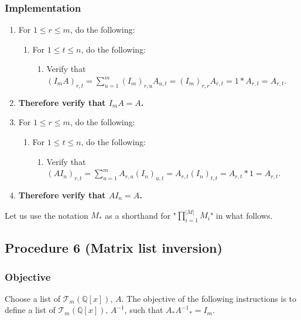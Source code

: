 \documentclass[twocolumn]{article}
\begin{document}
			\subsubsection{Implementation}
				\begin{enumerate}
					\item For $1\le r\le m$, do the following:
					\begin{enumerate}
						\item For $1\le t\le n$, do the following:
						\begin{enumerate}
							\item Verify that $(I_mA)_{r,t}=\sum_{u=1}^m (I_m)_{r,u}A_{u,t}=(I_m)_{r,r}A_{r,t}=1*A_{r,t}=A_{r,t}$.
						\end{enumerate}
					\end{enumerate}
					\item \textbf{Therefore verify that $I_mA=A$.}
					\item For $1\le r\le m$, do the following:
					\begin{enumerate}
						\item For $1\le t\le n$, do the following:
						\begin{enumerate}
							\item Verify that $(AI_n)_{r,t}=\sum_{u=1}^m A_{r,u}(I_n)_{u,t}=A_{r,t}(I_n)_{t,t}=A_{r,t}*1=A_{r,t}$.
						\end{enumerate}
					\end{enumerate}
					\item \textbf{Therefore verify that $AI_n=A$.}
				\end{enumerate}
		Let us use the notation $M_*$ as a shorthand for "$\prod_{i=1}^{\lvert M\rvert} M_i$" in what follows.
		\subsection{Procedure 6 (Matrix list inversion)}\label{sec:procedure 6}
			\subsubsection{Objective}
				Choose a list of $\mathcal{T}_{m}(\mathbb{Q}[x])$, $A$. The objective of the following instructions is to define a list of $\mathcal{T}_{m}(\mathbb{Q}[x])$, $A^{-1}$, such that $A_*{A^{-1}}_*=I_m$.
\end{document}
